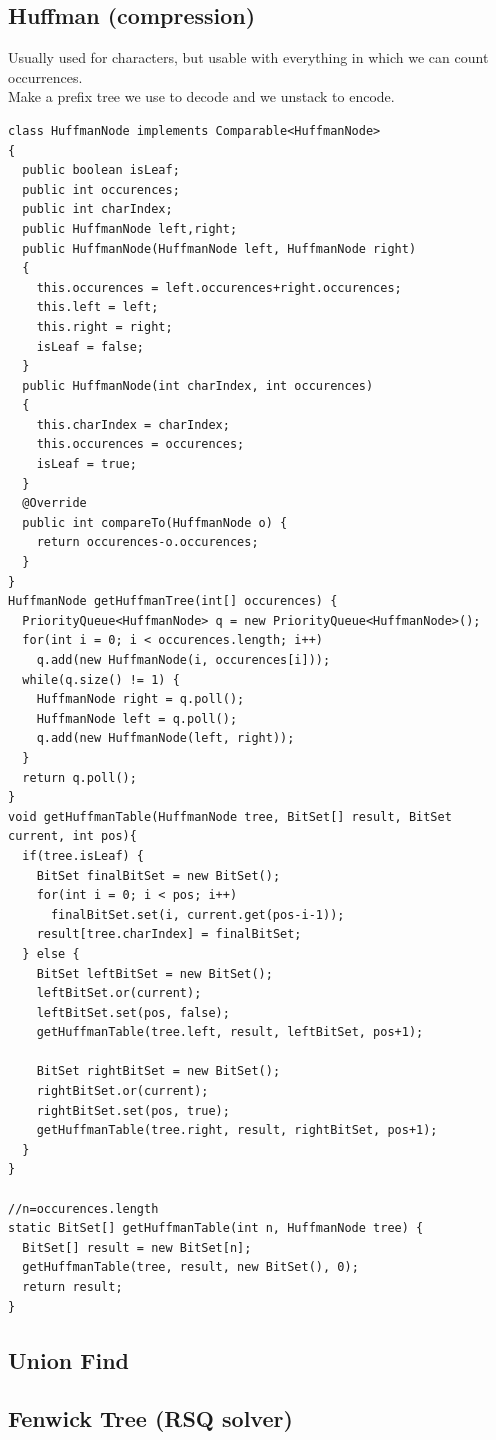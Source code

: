 \subsection{Huffman (compression)}
Usually used for characters, but usable with everything in which we can count occurrences. \\
Make a prefix tree we use to decode and we unstack to encode.
\begin{lstlisting}
class HuffmanNode implements Comparable<HuffmanNode>
{
  public boolean isLeaf;
  public int occurences;
  public int charIndex;
  public HuffmanNode left,right;
  public HuffmanNode(HuffmanNode left, HuffmanNode right)
  {
    this.occurences = left.occurences+right.occurences;
    this.left = left;
    this.right = right;
    isLeaf = false;
  } 
  public HuffmanNode(int charIndex, int occurences)
  {
    this.charIndex = charIndex;
    this.occurences = occurences;
    isLeaf = true;
  }
  @Override
  public int compareTo(HuffmanNode o) {
    return occurences-o.occurences;
  }
}
HuffmanNode getHuffmanTree(int[] occurences) {
  PriorityQueue<HuffmanNode> q = new PriorityQueue<HuffmanNode>();
  for(int i = 0; i < occurences.length; i++)
    q.add(new HuffmanNode(i, occurences[i]));
  while(q.size() != 1) {
    HuffmanNode right = q.poll();
    HuffmanNode left = q.poll();
    q.add(new HuffmanNode(left, right));
  }
  return q.poll();
}
void getHuffmanTable(HuffmanNode tree, BitSet[] result, BitSet current, int pos){
  if(tree.isLeaf) {
    BitSet finalBitSet = new BitSet();
    for(int i = 0; i < pos; i++)
      finalBitSet.set(i, current.get(pos-i-1));
    result[tree.charIndex] = finalBitSet;
  } else {
    BitSet leftBitSet = new BitSet();
    leftBitSet.or(current);
    leftBitSet.set(pos, false);
    getHuffmanTable(tree.left, result, leftBitSet, pos+1);
            
    BitSet rightBitSet = new BitSet();
    rightBitSet.or(current);
    rightBitSet.set(pos, true);
    getHuffmanTable(tree.right, result, rightBitSet, pos+1);
  }
}
    
//n=occurences.length
static BitSet[] getHuffmanTable(int n, HuffmanNode tree) {
  BitSet[] result = new BitSet[n];
  getHuffmanTable(tree, result, new BitSet(), 0);
  return result;
}
\end{lstlisting}
\subsection{Union Find}
\label{unionFind}

\subsection{Fenwick Tree (RSQ solver)}

